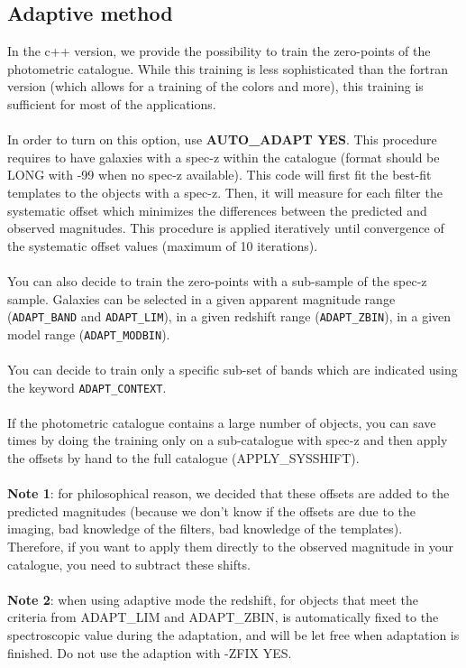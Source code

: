 \documentclass[12pt]{article}
\begin{document}
\subsection{Adaptive method} 


In the c++ version, we provide the possibility to train the zero-points of the photometric catalogue. While this training is less sophisticated than the fortran version (which allows for a training of the colors and more), this training is sufficient for most of the applications.\\
\\
In order to turn on this option, use {\bf AUTO\_ADAPT YES}. This procedure requires to have galaxies with a spec-z within the catalogue (format should be LONG with -99 when no spec-z available). This code will first fit the best-fit templates to the objects with a spec-z. Then, it will measure for each filter the systematic offset which minimizes the differences between the predicted and observed magnitudes. This procedure is applied iteratively until convergence of the systematic offset values (maximum of 10 iterations). \\
\\
You can also decide to train the zero-points with a sub-sample of the spec-z sample. Galaxies can be selected in a given apparent magnitude range (\texttt{ADAPT\_BAND} and \texttt{ADAPT\_LIM}), in a given redshift range (\texttt{ADAPT\_ZBIN}), in a given model range (\texttt{ADAPT\_MODBIN}).\\
\\
You can decide to train only a specific sub-set of bands which are indicated using the keyword \texttt{ADAPT\_CONTEXT}.\\
\\
If the photometric catalogue contains a large number of objects, you can save times by doing the training only on a sub-catalogue with spec-z and then apply the offsets by hand to the full catalogue (APPLY\_SYSSHIFT). \\
\\
{\bf Note 1}: for philosophical reason, we decided that these offsets are added to the predicted magnitudes (because we don't know if the offsets are due to the imaging, bad knowledge of the filters, bad knowledge of the templates). Therefore, if you want to apply them directly to the observed magnitude in your catalogue, you need to subtract these shifts.\\
\\ 
{\bf Note 2}: when using  adaptive mode  the redshift, for objects  that meet the criteria from  ADAPT\_LIM and ADAPT\_ZBIN, is automatically fixed to the spectroscopic  value during the adaptation, and will be let free when adaptation is finished. Do not use the adaption with -ZFIX YES.
  \\
  
\end{document}
